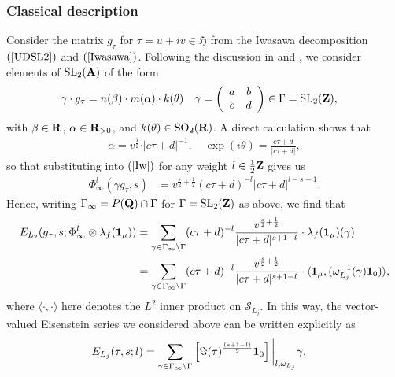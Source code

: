 \documentclass{amsart}
\theoremstyle{definition}
\begin{document}
\subsubsection{Classical description}

Consider the matrix $g_{\tau}$ for $\tau = u + iv \in \mathfrak{H}$ from the Iwasawa decomposition $(\ref{UDSL2})$ and $(\ref{Iwasawa})$. 
Following the discussion in \cite[$\S$ 2.2]{BY} and \cite{KY}, we consider elements of $\operatorname{SL}_2({\bf{A}})$ of the form 
\begin{align*} \gamma \cdot g_{\tau} &= n(\beta) \cdot m(\alpha) \cdot k(\theta) 
\quad  \gamma = \left( \begin{array}{cc} a & b \\ c & d \end{array} \right) \in \Gamma = \operatorname{SL}_2({\bf{Z}}), \end{align*}
with $\beta \in {\bf{R}}$, $\alpha \in {\bf{R}}_{>0}$, and $k(\theta) \in \operatorname{SO}_2({\bf{R}})$.
A direct calculation shows that  
\begin{align*} \alpha = v^{\frac{1}{2}} \cdot \vert c \tau  + d \vert^{-1}, \quad \exp(i \theta) = \frac{c \overline{\tau} + d }{\vert c \tau + d \vert}, \end{align*}
so that substituting into $(\ref{Iw})$ for any weight $l \in \frac{1}{2}{\bf{Z}}$ gives us
\begin{align*} \Phi_{\infty}^l(\gamma g_{\tau}, s) &= v^{\frac{s}{2} + \frac{1}{2}} (c \tau + d)^{-l} \vert c \tau + d \vert^{l-s-1}.\end{align*} 
Hence, writing $\Gamma_{\infty} = P({\bf{Q}}) \cap \Gamma$ for $\Gamma = \operatorname{SL}_2({\bf{Z}})$ as above, we find that
\begin{align*} E_{L_2}(g_{\tau}, s; \Phi_{\infty}^l \otimes \lambda_f({\bf{1}}_{\mu})) 
&= \sum\limits_{ \gamma \in \Gamma_{\infty} \backslash \Gamma}
(c \tau + d)^{-l} \frac{ v^{\frac{s}{2} + \frac{1}{2}}}{ \vert c \tau + d \vert^{s + 1 - l} } \cdot \lambda_f( {\bf{1}}_{\mu} )(\gamma) \\ 
&= \sum\limits_{ \gamma \in \Gamma_{\infty} \backslash \Gamma}
(c \tau + d)^{-l} \frac{ v^{\frac{s}{2} + \frac{1}{2}}}{ \vert c \tau + d \vert^{s + 1 - l} } 
\cdot \langle {\bf{1}}_{\mu }, (\omega_{L_j}^{-1}(\gamma) {\bf{1}}_{0} ) \rangle, \end{align*}
where $\langle \cdot, \cdot \rangle$ here denotes the $L^2$ inner product on $\mathcal{S}_{L_j}$. 
In this way, the vector-valued Eisenstein series we considered above can be written explicitly as 
\begin{align}\label{2.17} E_{L_j}(\tau, s; l) 
&= \sum\limits_{\gamma \in \Gamma_{\infty} \backslash \Gamma} \left[ \Im(\tau)^{\frac{(s +1 - l)}{2}} {\bf{1}}_0 \right]  \bigg\rvert_{l, \omega_{L_j}} \gamma. \end{align}
\end{document}
